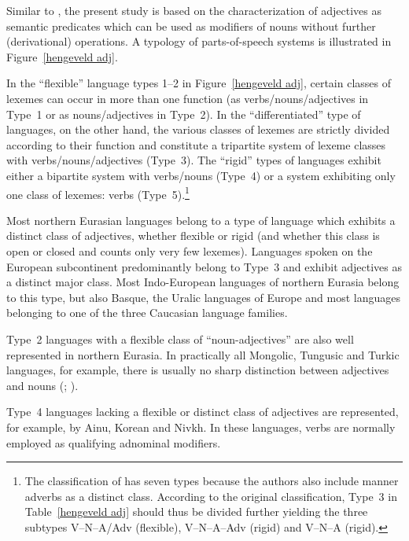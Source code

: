 Similar to \citet{hengeveld-etal2004}, the present study is based on the characterization of adjectives as semantic predicates which can be used as modifiers of nouns without further (derivational) operations. A typology of parts-of-speech systems is illustrated in Figure~\ref{hengeveld adj}.

In the “flexible” language types 1–2 in Figure~\ref{hengeveld adj}, certain classes of lexemes can occur in more than one function (as verbs/nouns/adjectives in Type~1 or as nouns/adjectives in Type~2). In the “differentiated” type of languages, on the other hand, the various classes of lexemes are strictly divided according to their function and constitute a tripartite system of lexeme classes with verbs\slash{}nouns\slash{}adjectives (Type~3). The “rigid” types of languages exhibit either a bipartite system with verbs/nouns (Type~4) or a system exhibiting only one class of lexemes: verbs (Type~5).\footnote{The classification of \citet{hengeveld-etal2004} has seven types because the authors also include manner adverbs as a distinct class. According to the original classification, Type~3 in Table~\ref{hengeveld adj} should thus be divided further yielding the three subtypes V–N–A/Adv (flexible), V–N–A–Adv (rigid) and V–N–A (rigid).} 

Most northern Eurasian languages belong to a type of language which exhibits a distinct class of adjectives, whether flexible or rigid (and whether this class is open or closed and counts only very few lexemes). Languages spoken on the European subcontinent predominantly belong to Type~3 and exhibit adjectives as a distinct major class. Most Indo-European languages of northern Eurasia belong to this type, but also Basque, the Uralic languages of Europe and most languages belonging to one of the three Caucasian language families.

Type~2 languages with a flexible class of “noun-adjectives” are also well represented in northern Eurasia. In practically all Mongolic, Tungusic and Turkic languages, for example, there is usually no sharp distinction between adjectives and nouns (\citealt[122–123]{rijkhoff2002}; \citealt[9]{poppe1964}).

Type~4 languages lacking a flexible or distinct class of adjectives are represented, for example, by Ainu, Korean and Nivkh. In these languages, verbs are normally employed as qualifying adnominal modifiers.

